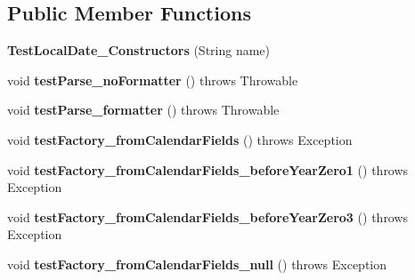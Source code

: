 \subsection*{Public Member Functions}
\begin{DoxyCompactItemize}
\item 
\hypertarget{classorg_1_1joda_1_1time_1_1_test_local_date___constructors_a01ed8ae6c3ea9daab4790b5e944e41b3}{{\bfseries Test\-Local\-Date\-\_\-\-Constructors} (String name)}\label{classorg_1_1joda_1_1time_1_1_test_local_date___constructors_a01ed8ae6c3ea9daab4790b5e944e41b3}

\item 
\hypertarget{classorg_1_1joda_1_1time_1_1_test_local_date___constructors_aa35211e1459f7467a4252d853672fd8d}{void {\bfseries test\-Parse\-\_\-no\-Formatter} ()  throws Throwable }\label{classorg_1_1joda_1_1time_1_1_test_local_date___constructors_aa35211e1459f7467a4252d853672fd8d}

\item 
\hypertarget{classorg_1_1joda_1_1time_1_1_test_local_date___constructors_a966ab9060ed8540afe6cbdacc31c8772}{void {\bfseries test\-Parse\-\_\-formatter} ()  throws Throwable }\label{classorg_1_1joda_1_1time_1_1_test_local_date___constructors_a966ab9060ed8540afe6cbdacc31c8772}

\item 
\hypertarget{classorg_1_1joda_1_1time_1_1_test_local_date___constructors_a59bcf0bd911979f9b80f49ca134ecc8e}{void {\bfseries test\-Factory\-\_\-from\-Calendar\-Fields} ()  throws Exception }\label{classorg_1_1joda_1_1time_1_1_test_local_date___constructors_a59bcf0bd911979f9b80f49ca134ecc8e}

\item 
\hypertarget{classorg_1_1joda_1_1time_1_1_test_local_date___constructors_a657292e38cc4bd494a750447981e5c7b}{void {\bfseries test\-Factory\-\_\-from\-Calendar\-Fields\-\_\-before\-Year\-Zero1} ()  throws Exception }\label{classorg_1_1joda_1_1time_1_1_test_local_date___constructors_a657292e38cc4bd494a750447981e5c7b}

\item 
\hypertarget{classorg_1_1joda_1_1time_1_1_test_local_date___constructors_a22b1a6c70a8704b68aa13aefbdfedff8}{void {\bfseries test\-Factory\-\_\-from\-Calendar\-Fields\-\_\-before\-Year\-Zero3} ()  throws Exception }\label{classorg_1_1joda_1_1time_1_1_test_local_date___constructors_a22b1a6c70a8704b68aa13aefbdfedff8}

\item 
\hypertarget{classorg_1_1joda_1_1time_1_1_test_local_date___constructors_a9e73c03812bb6f34acc94a375fc66d1a}{void {\bfseries test\-Factory\-\_\-from\-Calendar\-Fields\-\_\-null} ()  throws Exception }\label{classorg_1_1joda_1_1time_1_1_test_local_date___constructors_a9e73c03812bb6f34acc94a375fc66d1a}


\end{DoxyCompactItemize}

